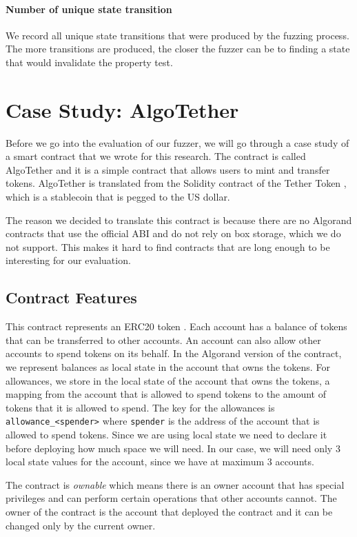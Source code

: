 \paragraph{Number of unique state transition} We record all unique state transitions that were produced by the fuzzing process.
The more transitions are produced, the closer the fuzzer can be to finding a state that would invalidate the property test.

\section{Case Study: AlgoTether} \label{section:case-study}
Before we go into the evaluation of our fuzzer, we will go through a case study of a smart contract that we wrote for this research.
The contract is called AlgoTether and it is a simple contract that allows users to mint and transfer tokens.
AlgoTether is translated from the Solidity contract of the Tether Token \cite{etherscanio_tether_nodate}, which is a stablecoin that is pegged to the US dollar.

The reason we decided to translate this contract is because there are no Algorand contracts that use the official \ac{ABI} and do not rely on box storage, which we do not support.
This makes it hard to find contracts that are long enough to be interesting for our evaluation.

\subsection*{Contract Features}
This contract represents an ERC20 token \cite{noauthor_erc-20_nodate}.
Each account has a balance of tokens that can be transferred to other accounts.
An account can also allow other accounts to spend tokens on its behalf.
In the Algorand version of the contract, we represent balances as local state in the account that owns the tokens.
For allowances, we store in the local state of the account that owns the tokens, a mapping from the account that is allowed to spend tokens to the amount of tokens that it is allowed to spend.
The key for the allowances is \texttt{allowance\_<spender>} where \texttt{spender} is the address of the account that is allowed to spend tokens.
Since we are using local state we need to declare it before deploying how much space we will need.
In our case, we will need only 3 local state values for the account, since we have at maximum 3 accounts.

The contract is \emph{ownable} which means there is an owner account that has special privileges and can perform certain operations that other accounts cannot.
The owner of the contract is the account that deployed the contract and it can be changed only by the current owner.

